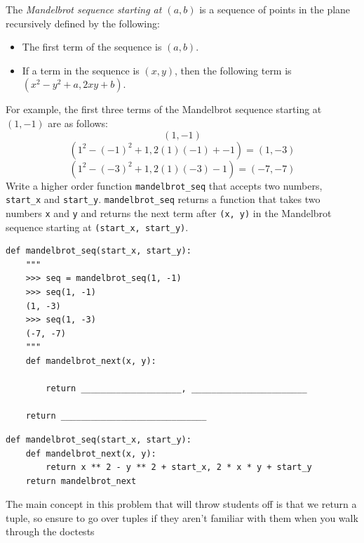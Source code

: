 \begin{blocksection}
\question The \textit{Mandelbrot sequence starting at $(a, b)$} is a sequence of points in the plane recursively defined by the following: 
\begin{itemize}
    \item The first term of the sequence is $(a, b)$.
    \item If a term in the sequence is $(x, y)$, then the following term is $(x^2 - y^2 + a, 2xy + b)$.
\end{itemize}
For example, the first three terms of the Mandelbrot sequence starting at $(1, -1)$ are as follows: 
$$(1, -1)$$ 
$$(1^2 - (-1)^2 + 1, 2(1)(-1) + -1) = (1, -3)$$ 
$$(1^2 - (-3)^2 + 1, 2(1)(-3) - 1) = (-7, -7)$$
Write a higher order function \lstinline{mandelbrot_seq} that accepts two numbers, \lstinline{start_x} and \lstinline{start_y}. \lstinline{mandelbrot_seq} returns a function that takes two numbers \lstinline{x} and \lstinline{y} and returns the next term after \lstinline{(x, y)} in the Mandelbrot sequence starting at \lstinline{(start_x, start_y)}.

\begin{lstlisting}
def mandelbrot_seq(start_x, start_y):
    """ 
    >>> seq = mandelbrot_seq(1, -1)
    >>> seq(1, -1)
    (1, -3)
    >>> seq(1, -3)
    (-7, -7)
    """
    def mandelbrot_next(x, y):

        return ____________________, _______________________

    return _____________________________
\end{lstlisting}

\begin{solution}
\begin{lstlisting}
def mandelbrot_seq(start_x, start_y):
    def mandelbrot_next(x, y):
        return x ** 2 - y ** 2 + start_x, 2 * x * y + start_y
    return mandelbrot_next
\end{lstlisting}
\end{solution}

\begin{questionmeta}
    The main concept in this problem that will throw students off is that we return a tuple,
    so ensure to go over tuples if they aren't familiar with them when you walk through the doctests
\end{questionmeta}
\end{blocksection}

